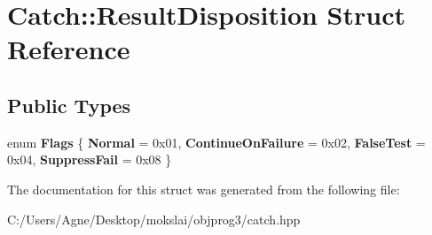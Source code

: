 \hypertarget{struct_catch_1_1_result_disposition}{}\section{Catch\+:\+:Result\+Disposition Struct Reference}
\label{struct_catch_1_1_result_disposition}
\subsection*{Public Types}
\begin{DoxyCompactItemize}
\item 
\mbox{\label{struct_catch_1_1_result_disposition_a3396cad6e2259af326b3aae93e23e9d8}} 
enum {\bfseries Flags} \{ {\bfseries Normal} = 0x01, 
{\bfseries Continue\+On\+Failure} = 0x02, 
{\bfseries False\+Test} = 0x04, 
{\bfseries Suppress\+Fail} = 0x08
 \}
\end{DoxyCompactItemize}


The documentation for this struct was generated from the following file\+:\begin{DoxyCompactItemize}
\item 
C\+:/\+Users/\+Agne/\+Desktop/mokslai/objprog3/catch.\+hpp\end{DoxyCompactItemize}
